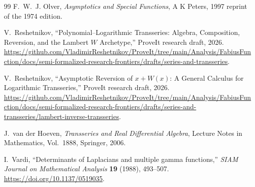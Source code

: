 \documentclass[11pt,oneside]{article}
\theoremstyle{plain}
\theoremstyle{definition}
\theoremstyle{remark}
\begin{document}
\begin{thebibliography}{99}
F.~W.~J. Olver,
\emph{Asymptotics and Special Functions},
A K Peters, 1997 reprint of the 1974 edition.

V.~Reshetnikov,
``Polynomial--Logarithmic Transseries: Algebra, Composition, Reversion, and the
Lambert \(W\) Archetype,''
ProveIt research draft, 2026.
\url{https://github.com/VladimirReshetnikov/ProveIt/tree/main/Analysis/FabiusFunction/docs/semi-formalized-research-frontiers/drafts/series-and-transseries}.

V.~Reshetnikov,
``Asymptotic Reversion of \(x+W(x)\): A General Calculus for Logarithmic
Transseries,''
ProveIt research draft, 2026.
\url{https://github.com/VladimirReshetnikov/ProveIt/tree/main/Analysis/FabiusFunction/docs/semi-formalized-research-frontiers/drafts/series-and-transseries/lambert-inverse-transseries}.

J.~van der Hoeven,
\emph{Transseries and Real Differential Algebra},
Lecture Notes in Mathematics, Vol.~1888, Springer, 2006.

I.~Vardi,
``Determinants of Laplacians and multiple gamma functions,''
\emph{SIAM Journal on Mathematical Analysis} \textbf{19} (1988), 493--507.
\url{https://doi.org/10.1137/0519035}.

\end{thebibliography}
\end{document}
